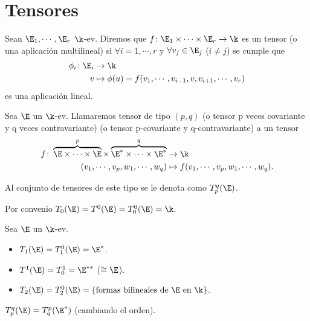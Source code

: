 \section{Tensores}

\begin{defi}[tensor]
    Sean $\E_1,\cdots , \E_r$ $\k$-ev. Diremos que
    $f \colon \E_1 \times \cdots \times \E_r \to \k$ es un tensor (o una aplicación
    multilineal) si $\forall i=1,\cdots , r$ y $\forall v_j \in \E_j$ ($i \neq j$)
    se cumple que
    \[
         \begin{aligned}
             \phi_i \colon \E_i &\to \k \\
             v &\mapsto \phi(u)=f(v_1,\cdots , v_{i-1}, v, v_{i+1}, \cdots , v_r)
         \end{aligned}
    \]
    es una aplicación lineal.
\end{defi}
\begin{defi}
    Sea $\E$ un $\k$-ev. Llamaremos tensor de tipo $(p,q)$ (o tensor p veces
    covariante y q veces contravariante) (o tensor p-covariante y q-contravariante)
    a un tensor
    \[
        \begin{aligned}
            f \colon \overbrace{\E \times \cdots \times \E}^p\times
            \overbrace{\E^* \times \cdots \times \E^*}^q&\to \k \\
            (v_1, \cdots, v_p, w_1, \cdots, w_q) &\mapsto
            f(v_1,\cdots,v_p,w_1,\cdots,w_q).
        \end{aligned}
    \]
\end{defi}
\begin{obs}
    Al conjunto de tensores  de este tipo se le denota como $T_p^q(\E)$.
\end{obs}
\begin{obs}
    Por convenio $T_0(\E) = T^0(\E) = T_0^0(\E) = \k$.
\end{obs}
\begin{example}
    Sea $\E$ un $\k$-ev.
    \begin{itemize}
        \item $T_1(\E) = T_1^0(\E) = \E^*$.
        \item $T^1(\E) = T_0^1 = \E^{**}$ ($\cong \E$).
        \item $T_2(\E) = T_2^0(\E) = \{\text{formas bilineales de } \E \text{ en } \k\}$.
    \end{itemize}
\end{example}
\begin{prop}
    $T_p^q(\E) = T_q^p(\E^*)$ (cambiando el orden).
\end{prop}
